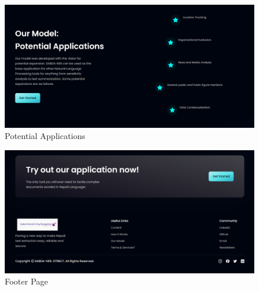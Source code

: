 \vspace{30pt}
 
\begin{figure}[H]
\centering
\includegraphics [scale=0.37]{img/UI/4applications.png}
 \caption[Potential Applications]{Potential Applications}
\end{figure}

\vspace{30pt}

\begin{figure}[H]
\centering
\includegraphics [scale=0.37]{img/UI/5footer.png}
 \caption[Footer Page]{Footer Page}
\end{figure}